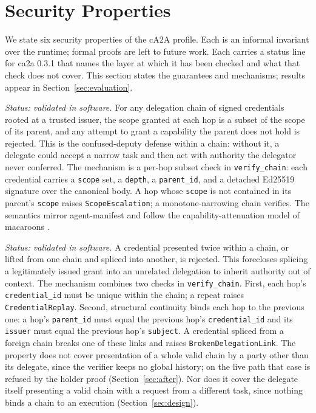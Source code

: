 \section{Security Properties}\label{sec:claims}

We state six security properties of the cA2A profile. Each is an informal invariant over the
runtime; formal proofs are left to future work. Each carries a status line for ca2a 0.3.1 that
names the layer at which it has been checked and what that check does not cover. This section
states the guarantees and mechanisms; results appear in Section~\ref{sec:evaluation}.

\begin{property}
\label{prop:c1}
\emph{Status: validated in software.} For any delegation chain of signed credentials rooted at a
trusted issuer, the scope granted at each hop is a subset of the scope of its parent, and any
attempt to grant a capability the parent does not hold is rejected. This is the confused-deputy
defense \citep{confuseddeputy1988} within a chain: without it, a delegate could accept a narrow task and then
act with authority the delegator never conferred. The mechanism is a per-hop subset check in
\texttt{verify\_chain}: each credential carries a \texttt{scope} set, a \texttt{depth}, a
\texttt{parent\_id}, and a detached Ed25519 signature \citep{eddsa2017} over the canonical body.
A hop whose \texttt{scope} is not contained in its parent's \texttt{scope} raises
\texttt{ScopeEscalation}; a monotone-narrowing chain verifies. The semantics mirror
agent-manifest \citep{agentmanifest2026} and follow the capability-attenuation model of
macaroons \citep{macaroons2014}.
\end{property}

\begin{property}
\label{prop:c2}
\emph{Status: validated in software.} A credential presented twice within a chain, or lifted
from one chain and spliced into another, is rejected. This forecloses splicing a legitimately
issued grant into an unrelated delegation to inherit authority out of context. The mechanism
combines two checks in \texttt{verify\_chain}. First, each hop's \texttt{credential\_id} must be
unique within the chain; a repeat raises \texttt{CredentialReplay}. Second, structural
continuity binds each hop to the previous one: a hop's \texttt{parent\_id} must equal the
previous hop's \texttt{credential\_id} and its \texttt{issuer} must equal the previous hop's
\texttt{subject}. A credential spliced from a foreign chain breaks one of these links and raises
\texttt{BrokenDelegationLink}. The property does not cover presentation of a whole valid chain
by a party other than its delegate, since the verifier keeps no global history; on the live path
that case is refused by the holder proof (Section~\ref{sec:after}). Nor does it cover the delegate
itself presenting a valid chain with a request from a different task, since nothing binds a
chain to an execution (Section~\ref{sec:design}).
\end{property}

